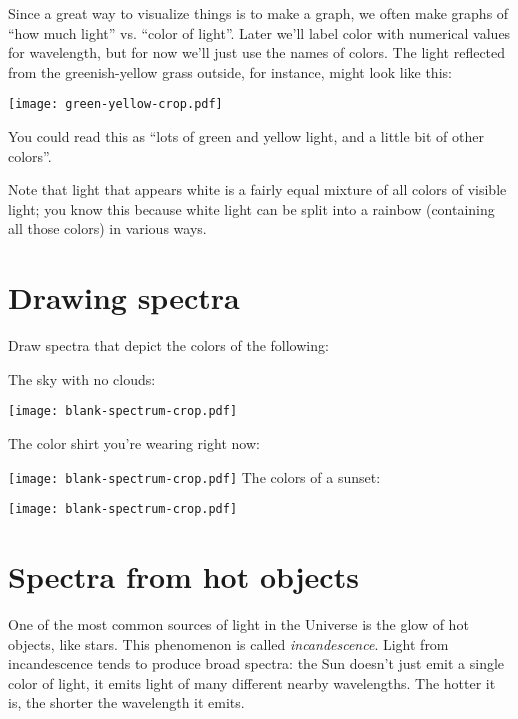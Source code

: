 \documentclass[11pt]{article}
\begin{document}
Since a great way to visualize things is to make a graph, we often make graphs of ``how much light'' vs. ``color of light''. Later we'll label color with numerical values for wavelength, but for now we'll just use the names of colors. The light reflected from the 
greenish-yellow grass outside, for instance, might look like this:


\begin{center}
\texttt{[image: green-yellow-crop.pdf]}
\end{center}

You could read this as ``lots of green and yellow light, and a little bit of other colors''. 

Note that light that appears white is a fairly equal mixture of all colors of visible light; you know this because white light can be split into a rainbow (containing all those colors) in various ways.

\section{Drawing spectra}

Draw spectra that depict the colors of the following:

\begin{center}

\large

The sky with no clouds:

\texttt{[image: blank-spectrum-crop.pdf]}

\bigskip

The color shirt you're wearing right now:

\texttt{[image: blank-spectrum-crop.pdf]}
\bigskip
\newpage
The colors of a sunset:

\texttt{[image: blank-spectrum-crop.pdf]}
\bigskip

\end{center}
\section{Spectra from hot objects}

One of the most common sources of light in the Universe is the glow of hot objects, like stars. This phenomenon is called {\it incandescence}. 
Light from incandescence tends to produce broad spectra: the Sun doesn't just emit a single color of light, it emits light of many different 
nearby wavelengths. The hotter it is, the shorter the wavelength it emits.
\end{document}
